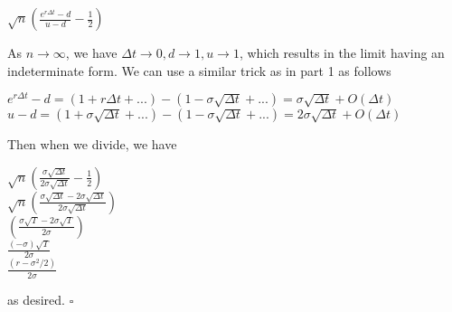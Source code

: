 \documentclass{article}
\begin{document}
\begin{enumerate}
\begin{flushleft}
            \begin{center}
                $\sqrt{n} \left(\frac{e^{r \Delta t} - d}{u-d} - \frac{1}{2}\right)$
            \end{center}
            As $n \rightarrow \infty$, we have $\Delta t \rightarrow 0, d \rightarrow 1, u \rightarrow 1$, which results in the limit having an indeterminate form. We can use a similar trick as in part 1 as follows
            \begin{center}
                $e^{r\Delta t} - d = (1 + r\Delta t + ...) - (1 - \sigma \sqrt{\Delta t} + ...) = \sigma \sqrt{\Delta t} + O(\Delta t)$ \\
                $u - d = (1 + \sigma \sqrt{\Delta t} + ...) - (1 - \sigma \sqrt{\Delta t} + ...) = 2\sigma \sqrt{\Delta t} + O(\Delta t)$
            \end{center}
            Then when we divide, we have
            \begin{center}
                $\sqrt{n}\left(\frac{\sigma \sqrt{\Delta t}}{2\sigma \sqrt{\Delta t}} - \frac{1}{2}\right)$ \\
                $\sqrt{n}\left(\frac{\sigma \sqrt{\Delta t} - 2\sigma \sqrt{\Delta t}}{2\sigma \sqrt{\Delta t}}\right)$ \\
                $\left(\frac{\sigma \sqrt{T} - 2\sigma\sqrt{T}}{2\sigma}\right)$ \\
                $\frac{(-\sigma)\sqrt{T}}{2\sigma}$ \\
                $\frac{(r - \sigma^2/2)}{2\sigma}$
            \end{center}
            as desired. $\square$
        \end{flushleft}
\end{enumerate}
\end{document}
